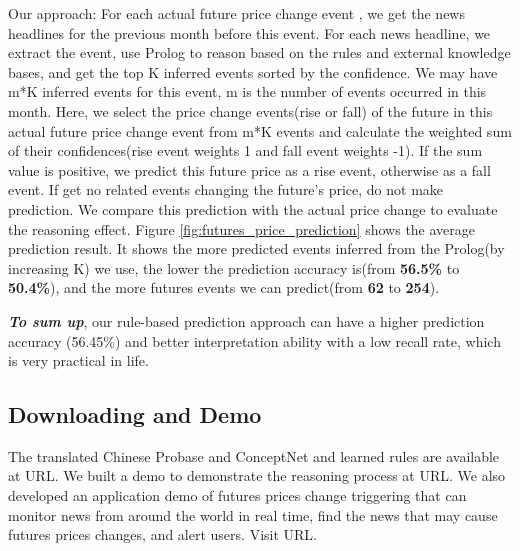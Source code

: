 Our approach: For each actual future price change event , we get the news headlines for the previous month before this event. 
For each news headline, we extract the event, use Prolog to reason based on the rules and external knowledge bases, and get the top K inferred events sorted by the confidence.
We may have m*K inferred events for this event, m is the number of events occurred in this month. 
Here, we select the price change events(rise or fall) of the future in this actual future price change event from m*K events and calculate the weighted sum of their confidences(rise event weights 1 and fall event weights -1). If the sum value is positive, we predict this future price as a rise event, otherwise as a fall event. If get no related events changing the future's price, do not make prediction. We compare this prediction with the actual price change to evaluate the reasoning effect. 
Figure \ref{fig:futures_price_prediction} shows the average prediction result. It shows the more predicted events inferred from the Prolog(by increasing K) we use, the lower the prediction accuracy is(from \textbf{56.5\%} to \textbf{50.4\%}), and the more futures events we can predict(from \textbf{62} to \textbf{254}). 

\textbf{\textit{To sum up}}, our rule-based prediction approach can have a higher prediction accuracy (56.45\%) and better interpretation ability with a low recall rate, which is very practical in life.


\subsection{Downloading and Demo}
The translated Chinese Probase and ConceptNet and learned rules are available at URL.
We built a demo to demonstrate the reasoning process at URL. 
We also developed an application demo of futures prices change triggering that can monitor news from around the world in real time, find the news that may cause futures prices changes, and alert users. Visit URL.